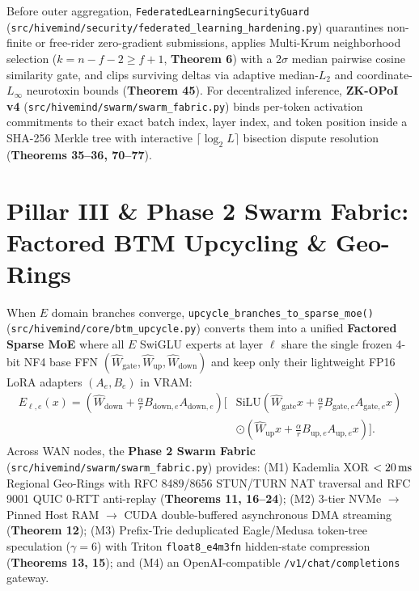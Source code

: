 \documentclass[11pt,a4paper]{article}
\begin{document}
Before outer aggregation, \texttt{FederatedLearningSecurityGuard} (\texttt{src/hivemind/security/federated\_learning\_hardening.py}) quarantines non-finite or free-rider zero-gradient submissions, applies Multi-Krum neighborhood selection ($k = n - f - 2 \ge f + 1$, \textbf{Theorem 6}) with a $2\sigma$ median pairwise cosine similarity gate, and clips surviving deltas via adaptive median-$L_2$ and coordinate-$L_\infty$ neurotoxin bounds (\textbf{Theorem 45}). For decentralized inference, \textbf{ZK-OPoI v4} (\texttt{src/hivemind/swarm/swarm\_fabric.py}) binds per-token activation commitments to their exact batch index, layer index, and token position inside a SHA-256 Merkle tree with interactive $\lceil \log_2 L \rceil$ bisection dispute resolution (\textbf{Theorems 35--36, 70--77}).

\section{Pillar III \& Phase 2 Swarm Fabric: Factored BTM Upcycling \& Geo-Rings}

When $E$ domain branches converge, \texttt{upcycle\_branches\_to\_sparse\_moe()} (\texttt{src/hivemind/core/btm\_upcycle.py}) converts them into a unified \textbf{Factored Sparse MoE} where all $E$ SwiGLU experts at layer $\ell$ share the single frozen 4-bit NF4 base FFN $(\hat{W}_{\text{gate}}, \hat{W}_{\text{up}}, \hat{W}_{\text{down}})$ and keep only their lightweight FP16 LoRA adapters $(A_e, B_e)$ in VRAM:
\begin{equation}
\begin{split}
    E_{\ell, e}(x) = \left(\hat{W}_{\text{down}} + \tfrac{\alpha}{r} B_{\text{down}, e} A_{\text{down}, e}\right) \Big[ &\text{SiLU}\!\left(\hat{W}_{\text{gate}} x + \tfrac{\alpha}{r} B_{\text{gate}, e} A_{\text{gate}, e} x\right) \\
    &\odot \left(\hat{W}_{\text{up}} x + \tfrac{\alpha}{r} B_{\text{up}, e} A_{\text{up}, e} x\right) \Big].
\end{split}
\end{equation}
Across WAN nodes, the \textbf{Phase 2 Swarm Fabric} (\texttt{src/hivemind/swarm/swarm\_fabric.py}) provides: (M1) Kademlia XOR $<20\text{\,ms}$ Regional Geo-Rings with RFC 8489/8656 STUN/TURN NAT traversal and RFC 9001 QUIC 0-RTT anti-replay (\textbf{Theorems 11, 16--24}); (M2) 3-tier NVMe $\to$ Pinned Host RAM $\to$ CUDA double-buffered asynchronous DMA streaming (\textbf{Theorem 12}); (M3) Prefix-Trie deduplicated Eagle/Medusa token-tree speculation ($\gamma = 6$) with Triton \texttt{float8\_e4m3fn} hidden-state compression (\textbf{Theorems 13, 15}); and (M4) an OpenAI-compatible \texttt{/v1/chat/completions} gateway.
\end{document}
